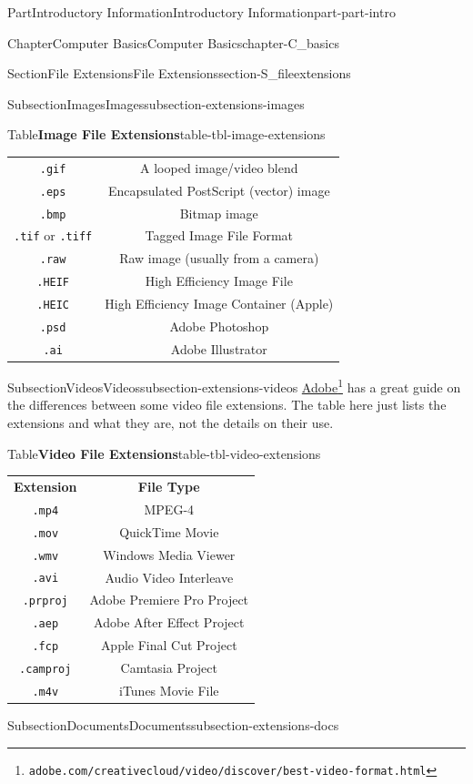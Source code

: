 \documentclass[oneside,10pt,]{book}
\newcommand{\tabularfont}{\relax}
\newcommand{\mono}[1]{\texttt{#1}}
\begin{document}
\begin{partptx}{Part}{Introductory Information}{}{Introductory Information}{}{}{part-part-intro}
\begin{chapterptx}{Chapter}{Computer Basics}{}{Computer Basics}{}{}{chapter-C_basics}
\begin{sectionptx}{Section}{File Extensions}{}{File Extensions}{}{}{section-S_fileextensions}
\begin{subsectionptx}{Subsection}{Images}{}{Images}{}{}{subsection-extensions-images}
\begin{tableptx}{Table}{\textbf{Image File Extensions}}{table-tbl-image-extensions}{}
{\begin{tabular}{cc}
\mono{.gif}&A looped image\slash{}video blend\tabularnewline[0pt]
\mono{.eps}&Encapsulated PostScript (vector) image\tabularnewline[0pt]
\mono{.bmp}&Bitmap image\tabularnewline[0pt]
\mono{.tif} or \mono{.tiff}&Tagged Image File Format\tabularnewline[0pt]
\mono{.raw}&Raw image (usually from a camera)\tabularnewline[0pt]
\mono{.HEIF}&High Efficiency Image File\tabularnewline[0pt]
\mono{.HEIC}&High Efficiency Image Container (Apple)\tabularnewline[0pt]
\mono{.psd}&Adobe Photoshop\tabularnewline[0pt]
\mono{.ai}&Adobe Illustrator
\end{tabular}
}%
\end{tableptx}%
\end{subsectionptx}
%
%
\typeout{************************************************}
\typeout{************************************************}
%
\begin{subsectionptx}{Subsection}{Videos}{}{Videos}{}{}{subsection-extensions-videos}
%
\href{https://www.adobe.com/creativecloud/video/discover/best-video-format.html}{Adobe}\footnote{\nolinkurl{adobe.com/creativecloud/video/discover/best-video-format.html}\label{fn-extensions-videos-c-b}} has a great guide on the differences between some video file extensions. The table here just lists the extensions and what they are, not the details on their use.%
\begin{tableptx}{Table}{\textbf{Video File Extensions}}{table-tbl-video-extensions}{}%
\centering%
{\tabularfont%
\begin{tabular}{cc}
{\bfseries{}Extension}&{\bfseries{}File Type}\tabularnewline[0pt]
\mono{.mp4}&MPEG-4\tabularnewline[0pt]
\mono{.mov}&QuickTime Movie\tabularnewline[0pt]
\mono{.wmv}&Windows Media Viewer\tabularnewline[0pt]
\mono{.avi}&Audio Video Interleave\tabularnewline[0pt]
\mono{.prproj}&Adobe Premiere Pro Project\tabularnewline[0pt]
\mono{.aep}&Adobe After Effect Project\tabularnewline[0pt]
\mono{.fcp}&Apple Final Cut Project\tabularnewline[0pt]
\mono{.camproj}&Camtasia Project\tabularnewline[0pt]
\mono{.m4v}&iTunes Movie File
\end{tabular}
}%
\end{tableptx}%
\end{subsectionptx}
%
%
\typeout{************************************************}
\typeout{************************************************}
%
\begin{subsectionptx}{Subsection}{Documents}{}{Documents}{}{}{subsection-extensions-docs}
%

\end{subsectionptx}
\end{sectionptx}
\end{chapterptx}
\end{partptx}
\end{document}
